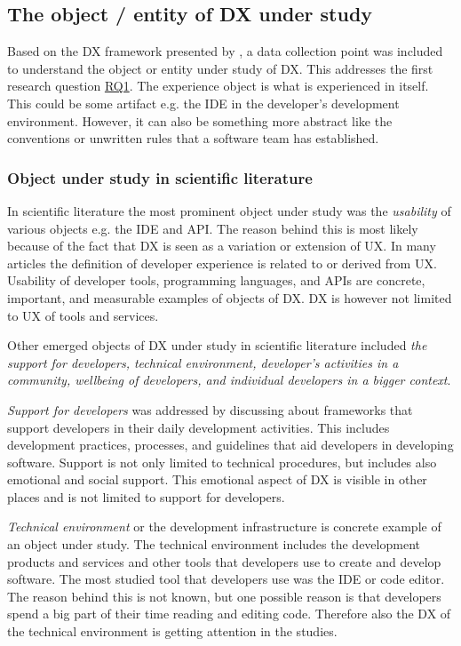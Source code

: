 \documentclass[english, 12pt, a4paper, sci, utf8, a-1b, online]{aaltothesis}
\begin{document}
\subsection{The object / entity of DX under study}

Based on the DX framework presented by \textcite{fagerholm-doctoral-thesis}, a data collection point was included to understand the object or entity under study of DX. This addresses the first research question \hyperref[RQ1]{RQ1}. The experience object is what is experienced in itself. This could be some artifact e.g. the IDE in the developer's development environment. However, it can also be something more abstract like the conventions or unwritten rules that a software team has established.

\subsubsection{Object under study in scientific literature}

In scientific literature the most prominent object under study was the \textit{usability} of various objects e.g. the IDE and API. The reason behind this is most likely because of the fact that DX is seen as a variation or extension of UX. In many articles the definition of developer experience is related to or derived from UX. Usability of developer tools, programming languages, and APIs are concrete, important, and measurable examples of objects of DX. DX is however not limited to UX of tools and services.

Other emerged objects of DX under study in scientific literature included \textit{the support for developers, technical environment, developer's activities in a community, wellbeing of developers, and individual developers in a bigger context}.

\textit{Support for developers} was addressed by discussing about frameworks that support developers in their daily development activities. This includes development practices, processes, and guidelines that aid developers in developing software. Support is not only limited to technical procedures, but includes also emotional and social support. This emotional aspect of DX is visible in other places and is not limited to support for developers.

\textit{Technical environment} or the development infrastructure is concrete example of an object under study. The technical environment includes the development products and services and other tools that developers use to create and develop software. The most studied tool that developers use was the IDE or code editor. The reason behind this is not known, but one possible reason is that developers spend a big part of their time reading and editing code. Therefore also the DX of the technical environment is getting attention in the studies.
\end{document}
